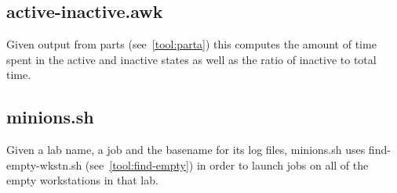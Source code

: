 \documentclass{article}
\begin{document}
\subsection{active-inactive.awk} \label{tool:active-inactive}
Given output from parts (see~\ref{tool:parta}) this computes the amount of time
spent in the active and inactive states as well as the ratio of inactive to
total time.

\subsection{minions.sh} \label{tool:minions}
Given a lab name, a job and the basename for its log files, minions.sh
uses find-empty-wkstn.sh (see~\ref{tool:find-empty}) in order to launch jobs on
all of the empty workstations in that lab.
\end{document}

